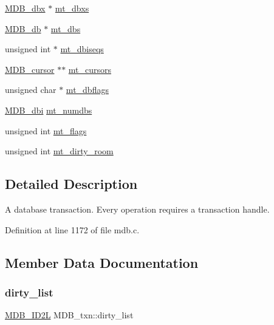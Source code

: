 \begin{DoxyCompactItemize}
\begin{tabbing}
\end{tabbing}\item 
\mbox{\hyperlink{struct_m_d_b__dbx}{M\+D\+B\+\_\+dbx}} $\ast$ \mbox{\hyperlink{struct_m_d_b__txn_aa837e463f7e79368b55bec22baa0233b}{mt\+\_\+dbxs}}
\item 
\mbox{\hyperlink{struct_m_d_b__db}{M\+D\+B\+\_\+db}} $\ast$ \mbox{\hyperlink{struct_m_d_b__txn_a4e24dfe1a2ade2e1bf4c7305cef267b3}{mt\+\_\+dbs}}
\item 
unsigned int $\ast$ \mbox{\hyperlink{struct_m_d_b__txn_a17bc725a62160766a6f844b5602799ee}{mt\+\_\+dbiseqs}}
\item 
\mbox{\hyperlink{struct_m_d_b__cursor}{M\+D\+B\+\_\+cursor}} $\ast$$\ast$ \mbox{\hyperlink{struct_m_d_b__txn_aa8a8241adc1169c76b95498432540ce7}{mt\+\_\+cursors}}
\item 
unsigned char $\ast$ \mbox{\hyperlink{struct_m_d_b__txn_a484dbc29f7f03b58676463d65cb628f1}{mt\+\_\+dbflags}}
\item 
\mbox{\hyperlink{group__mdb_gadbe68a06c448dfb62da16443d251a78b}{M\+D\+B\+\_\+dbi}} \mbox{\hyperlink{struct_m_d_b__txn_ad4ead449fef79be9fb69c8c4279a6163}{mt\+\_\+numdbs}}
\item 
unsigned int \mbox{\hyperlink{struct_m_d_b__txn_a6daba5db3d626e789a7d4c8ee3d8c840}{mt\+\_\+flags}}
\item 
unsigned int \mbox{\hyperlink{struct_m_d_b__txn_ab62f1ad8141d56c66c8548934b7e0977}{mt\+\_\+dirty\+\_\+room}}
\end{DoxyCompactItemize}


\subsection{Detailed Description}
A database transaction. Every operation requires a transaction handle. 

Definition at line 1172 of file mdb.\+c.



\subsection{Member Data Documentation}
\mbox{\label{struct_m_d_b__txn_a0a89cc7b39f5aec84f629a2b43bb64d5}} 
\subsubsection{\texorpdfstring{dirty\+\_\+list}{dirty\_list}}
{\footnotesize\ttfamily \mbox{\hyperlink{group__idls_gafcc5d61c06c726db2be5d088dbc68d51}{M\+D\+B\+\_\+\+I\+D2L}} M\+D\+B\+\_\+txn\+::dirty\+\_\+list}

